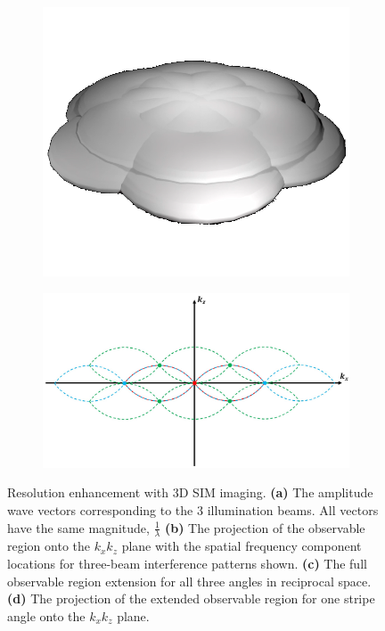 \begin{figure}
	\begin{subfigure}[t]{0.35\textwidth}
		\centering
		\includegraphics[width=\linewidth]{images/3D_SIM_OTF_all_angles.png}
		\caption{}
		\label{fig:3D_SIM_OTF_all_angles}
	\end{subfigure}
	\begin{subfigure}[t]{0.625\textwidth}
		\centering
		\includegraphics[width=\linewidth]{images/3D_SIM_OTF_1_angle_2D_plot.jpg}
		\caption{}
		\label{fig:3D_SIM_OTF_1_angle_2D_plot}
	\end{subfigure}	
	\caption[Resolution enhancement with 3D SIM imaging]{Resolution enhancement 
		with 3D SIM imaging. \textbf{(a)} The amplitude wave vectors 
		corresponding to the 3 illumination beams. All vectors have the 
		same magnitude, $\frac{1}{\lambda}$ \textbf{(b)} The projection of the 
		observable region onto the $k_{x}k_{z}$ plane with the spatial frequency 
		component locations for three-beam interference patterns shown. 
		\textbf{(c)} The full observable region extension for all three angles in 
		reciprocal space. \textbf{(d)} The projection of the extended observable 
		region for one stripe angle onto the $k_{x}k_{z}$ plane.}
	\label{fig:3D_SIM_visualisation}
\end{figure}

